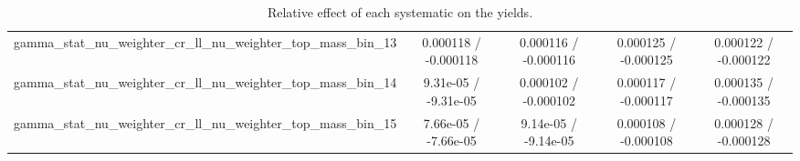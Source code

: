 \documentclass[10pt]{article}
\begin{document}
\begin{table}[htbp]
\begin{center}
\begin{tabular}{|c|c|c|c|c|}
  gamma_stat_nu_weighter_cr_ll_nu_weighter_top_mass_bin_13 & 0.000118 / -0.000118 & 0.000116 / -0.000116 & 0.000125 / -0.000125 & 0.000122 / -0.000122 \\ 
  gamma_stat_nu_weighter_cr_ll_nu_weighter_top_mass_bin_14 & 9.31e-05 / -9.31e-05 & 0.000102 / -0.000102 & 0.000117 / -0.000117 & 0.000135 / -0.000135 \\ 
  gamma_stat_nu_weighter_cr_ll_nu_weighter_top_mass_bin_15 & 7.66e-05 / -7.66e-05 & 9.14e-05 / -9.14e-05 & 0.000108 / -0.000108 & 0.000128 / -0.000128 \\ 
\hline 
\end{tabular} 
\caption{Relative effect of each systematic on the yields.} 
\end{center} 
\end{table} 
\end{document}

